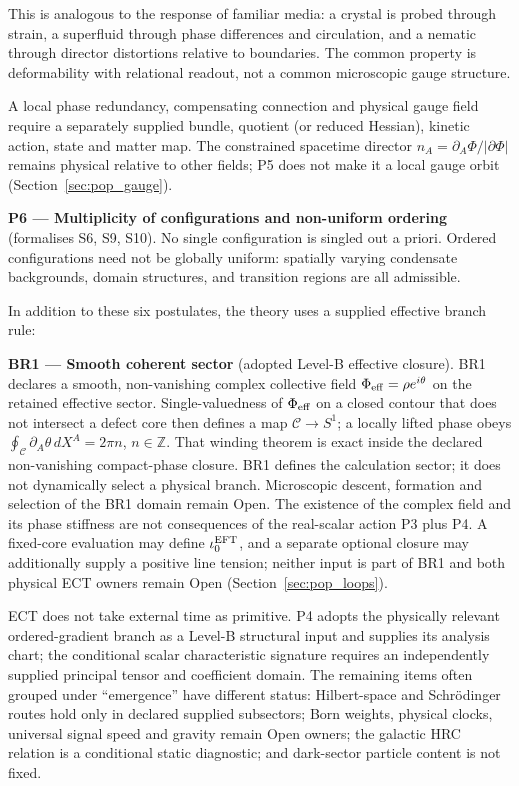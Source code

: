 \documentclass[11pt,a4paper]{article}
\begin{document}
This is analogous to the response of familiar media: a crystal is probed through strain, a superfluid through phase differences and circulation, and a nematic through director distortions relative to boundaries.  The common property is deformability with relational readout, not a common microscopic gauge structure.

A local phase redundancy, compensating connection and physical gauge field require a separately supplied bundle, quotient (or reduced Hessian), kinetic action, state and matter map.  The constrained spacetime director $n_A=\partial_A\Phi/|\partial\Phi|$ remains physical relative to other fields; P5 does not make it a local gauge orbit (Section~\ref{sec:pop_gauge}).

\textbf{P6 --- Multiplicity of configurations and non-uniform ordering} (formalises S6, S9, S10).
No single configuration is singled out a priori. Ordered configurations need not be globally uniform: spatially varying condensate backgrounds, domain structures, and transition regions are all admissible.

In addition to these six postulates, the theory uses a supplied effective branch rule:

\textbf{BR1 --- Smooth coherent sector} (adopted Level-B effective closure).
BR1 declares a smooth, non-vanishing complex collective field $\Phi_{\rm eff}=\rho e^{i\theta}$ on the retained effective sector. Single-valuedness of $\Phi_{\rm eff}$ on a closed contour that does not intersect a defect core then defines a map $\mathcal C\to S^1$; a locally lifted phase obeys $\oint_{\mathcal C}\partial_A\theta\,dX^A=2\pi n$, $n\in\mathbb Z$.  That winding theorem is exact inside the declared non-vanishing compact-phase closure.  BR1 defines the calculation sector; it does not dynamically select a physical branch.  Microscopic descent, formation and selection of the BR1 domain remain Open. The existence of the complex field and its phase stiffness are not consequences of the real-scalar action P3 plus P4.  A fixed-core evaluation may define $\iota_0^{\rm EFT}$, and a separate optional closure may additionally supply a positive line tension; neither input is part of BR1 and both physical ECT owners remain Open (Section~\ref{sec:pop_loops}).

ECT does not take external time as primitive.  P4 adopts the physically
relevant ordered-gradient branch as a Level-B structural input and supplies
its analysis chart; the conditional scalar characteristic signature requires
an independently supplied principal tensor and coefficient domain.  The
remaining items often grouped under ``emergence'' have different status:
Hilbert-space and Schr\"odinger routes hold only in declared supplied
subsectors; Born weights, physical clocks, universal signal speed and gravity
remain Open owners; the galactic HRC relation is a conditional static
diagnostic; and dark-sector particle content is not fixed.
\end{document}
